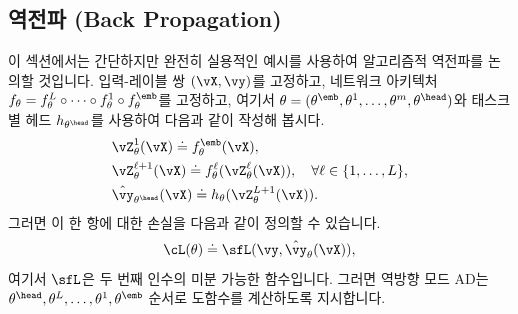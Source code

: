 \documentclass[../../book-main_ko.tex]{subfiles}
\begin{document}
\subsection{역전파 (Back Propagation)}
\label{app:BP-section}
이 섹션에서는 간단하지만 완전히 실용적인 예시를 사용하여 알고리즘적 역전파를 논의할 것입니다. 입력-레이블 쌍 \((\vX, \vy)\)를 고정하고, 네트워크 아키텍처 \(f_{\theta} = f_{\theta}^{L} \circ \cdots \circ f_{\theta}^{1} \circ f_{\theta}^{\emb}\)를 고정하고, 여기서 \(\theta = (\theta^{\emb}, \theta^{1}, \dots, \theta^{m}, \theta^{\head})\)와 태스크별 헤드 \(h_{\theta^{\head}}\)를 사용하여 다음과 같이 작성해 봅시다.
\begin{align}
    &\vZ_{\theta}^{1}(\vX) \doteq f_{\theta}^{\emb}(\vX), \\
    &\vZ_{\theta}^{\ell + 1}(\vX) \doteq f_{\theta}^{\ell}(\vZ_{\theta}^{\ell}(\vX)), \quad \forall \ell \in \{1, \dots, L\}, \\
    &\hat{\vy}_{\theta^{\head}}(\vX) \doteq h_{\theta}(\vZ_{\theta}^{L+1}(\vX)).
\end{align}
그러면 이 한 항에 대한 손실을 다음과 같이 정의할 수 있습니다.
\begin{equation}
    \cL(\theta) \doteq \sfL(\vy, \hat{\vy}_{\theta}(\vX)),
\end{equation}
여기서 \(\sfL\)은 두 번째 인수의 미분 가능한 함수입니다. 그러면 역방향 모드 AD는 \(\theta^{\head}, \theta^{L}, \dots, \theta^{1}, \theta^{\emb}\) 순서로 도함수를 계산하도록 지시합니다.
\end{document}

